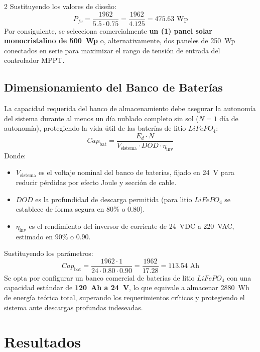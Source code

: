 \documentclass[a4paper, 11pt]{article}
\begin{document}
\begin{multicols}{2}
Sustituyendo los valores de diseño:
\begin{equation*}
    P_{fv} = \frac{1962}{5.5 \cdot 0.75} = \frac{1962}{4.125} = 475.63 \text{ Wp}
\end{equation*}
Por consiguiente, se selecciona comercialmente \textbf{un (1) panel solar monocristalino de \SI{500}{Wp}} o, alternativamente, dos paneles de \SI{250}{Wp} conectados en serie para maximizar el rango de tensión de entrada del controlador MPPT.

\subsection{Dimensionamiento del Banco de Baterías}
La capacidad requerida del banco de almacenamiento debe asegurar la autonomía del sistema durante al menos un día nublado completo sin sol ($N = 1$ día de autonomía), protegiendo la vida útil de las baterías de litio $LiFePO_4$:
\begin{equation}
    Cap_{\text{bat}} = \frac{E_d \cdot N}{V_{\text{sistema}} \cdot DOD \cdot \eta_{\text{inv}}}
\end{equation}
Donde:
\begin{itemize}
    \item $V_{\text{sistema}}$ es el voltaje nominal del banco de baterías, fijado en \SI{24}{V} para reducir pérdidas por efecto Joule y sección de cable.
    \item $DOD$ es la profundidad de descarga permitida (para litio $LiFePO_4$ se establece de forma segura en $80\%$ o $0.80$).
    \item $\eta_{\text{inv}}$ es el rendimiento del inversor de corriente de \SI{24}{VDC} a \SI{220}{VAC}, estimado en $90\%$ o $0.90$.
\end{itemize}

Sustituyendo los parámetros:
\begin{equation*}
    Cap_{\text{bat}} = \frac{1962 \cdot 1}{24 \cdot 0.80 \cdot 0.90} = \frac{1962}{17.28} = 113.54 \text{ Ah}
\end{equation*}
Se opta por configurar un banco comercial de baterías de litio $LiFePO_4$ con una capacidad estándar de \textbf{\SI{120}{Ah} a \SI{24}{V}}, lo que equivale a almacenar \SI{2880}{Wh} de energía teórica total, superando los requerimientos críticos y protegiendo el sistema ante descargas profundas indeseadas.

\section{Resultados}


\end{multicols}
\end{document}
